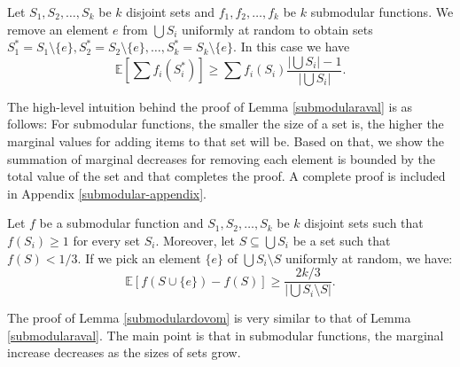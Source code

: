 \begin{comment}
\begin{lemma} \label{submodularsefr}
	In a $1/3$-irreducible instance of the problem for every item $\ite_j$ and every agent $\agent_i$ we have
	$$\valu_i(\{\ite_j\}) < 1/3.$$
\end{lemma}

The proof of Lemma \ref{submodularsefr} follows from the definition of reducibility. We show if for an agent $\agent_i$ and an item $\ite_j$, $\valu_i(\{\ite_j\}) \geq 1/3$ holds then we can assign $\ite_j$ to $\agent_i$ and reduce the problem. This contradicts with the definition of reducibility.
\end{comment}
\begin{lemma}\label{submodularaval}
	Let $S_1, S_2, \ldots, S_k$ be $k$ disjoint sets and $f_1, f_2, \ldots, f_k$ be $k$ submodular functions. We remove an element $e$ from $\bigcup S_i$ uniformly at random to obtain sets $S^*_1 = S_1 \setminus \{e\}, S^*_2 = S_2 \setminus \{e\}, \ldots, S^*_k = S_k \setminus \{e\}$. In this case we have
	$$\mathbb{E}[\sum f_i(S^*_i)] \geq \sum f_i(S_i)\frac{|\bigcup S_i| -1}{|\bigcup S_i|}.$$
\end{lemma}

The high-level intuition behind the proof of Lemma \ref{submodularaval} is as follows: For submodular functions, the smaller the size of a set is, the higher the marginal values for adding items to that set will be. Based on that, we show the summation of marginal decreases for removing each element is bounded by the total value of the set and that completes the proof. A complete proof is included in Appendix \ref{submodular-appendix}. 

\begin{lemma}\label{submodulardovom}
	Let $f$ be a submodular function and $S_1, S_2, \ldots, S_k$ be $k$ disjoint sets such that $f(S_i) \geq 1$ for every set $S_i$. Moreover, let $S \subseteq \bigcup S_i$ be a set such that $f(S) < 1/3$. If we pick an element $\{e\}$ of $\bigcup S_i \setminus S$ uniformly at random, we have:
	$$\mathbb{E}[f(S \cup \{e\}) - f(S)] \geq \frac{2k/3}{|\bigcup S_i \setminus S|}.$$ 
\end{lemma}
The proof of Lemma \ref{submodulardovom} is very similar to that of Lemma \ref{submodularaval}. The main point is that in submodular functions, the marginal increase decreases as the sizes of sets grow.

